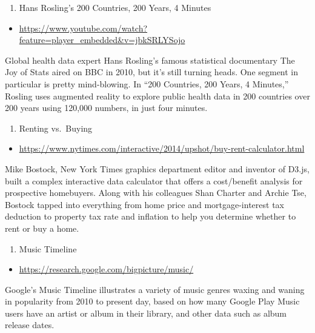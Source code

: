 \documentclass[]{book}
\providecommand{\tightlist}{%
  \setlength{\itemsep}{0pt}\setlength{\parskip}{0pt}}
\theoremstyle{definition}
\theoremstyle{definition}
\theoremstyle{definition}
\theoremstyle{remark}
\begin{document}
\begin{enumerate}
\def\labelenumi{\arabic{enumi}.}
\setcounter{enumi}{3}
\tightlist
\item
  Hans Rosling's 200 Countries, 200 Years, 4 Minutes
\end{enumerate}

\begin{itemize}
\tightlist
\item
  \url{https://www.youtube.com/watch?feature=player_embedded\&v=jbkSRLYSojo}
\end{itemize}

Global health data expert Hans Rosling's famous statistical documentary
The Joy of Stats aired on BBC in 2010, but it's still turning heads. One
segment in particular is pretty mind-blowing. In ``200 Countries, 200
Years, 4 Minutes,'' Rosling uses augmented reality to explore public
health data in 200 countries over 200 years using 120,000 numbers, in
just four minutes.

\begin{enumerate}
\def\labelenumi{\arabic{enumi}.}
\setcounter{enumi}{4}
\tightlist
\item
  Renting vs.~Buying
\end{enumerate}

\begin{itemize}
\tightlist
\item
  \url{https://www.nytimes.com/interactive/2014/upshot/buy-rent-calculator.html}
\end{itemize}

Mike Bostock, New York Times graphics department editor and inventor of
D3.js, built a complex interactive data calculator that offers a
cost/benefit analysis for prospective homebuyers. Along with his
colleagues Shan Charter and Archie Tse, Bostock tapped into everything
from home price and mortgage-interest tax deduction to property tax rate
and inflation to help you determine whether to rent or buy a home.

\begin{enumerate}
\def\labelenumi{\arabic{enumi}.}
\setcounter{enumi}{5}
\tightlist
\item
  Music Timeline
\end{enumerate}

\begin{itemize}
\tightlist
\item
  \url{https://research.google.com/bigpicture/music/}
\end{itemize}

Google's Music Timeline illustrates a variety of music genres waxing and
waning in popularity from 2010 to present day, based on how many Google
Play Music users have an artist or album in their library, and other
data such as album release dates.
\end{document}
